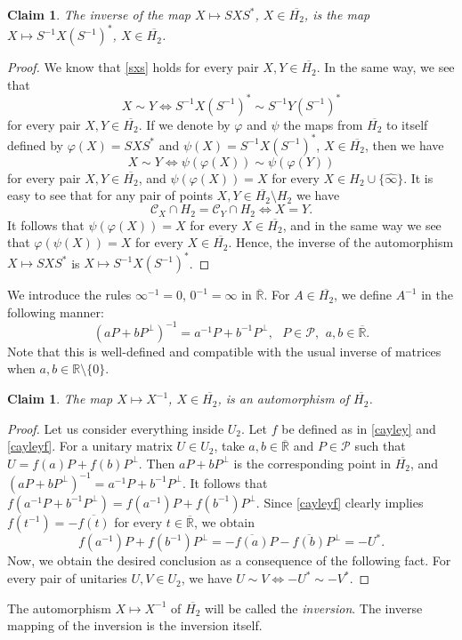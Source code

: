 \documentclass[10pt,a4paper]{amsart}
\providecommand{\index}[1]{}
\newcommand\cP{{\mathcal{P}}}
\newcommand\bR{{\mathbb{R}}}
\newcommand\oH{{\overline{H_2}}}
\newcommand\oi{{\widehat{\infty}}}
\newcommand\oR{{\overline{\mathbb{R}}}}
\newtheorem{claim}[theorem]{Claim}
\theoremstyle{definition}
\theoremstyle{remark}
\numberwithin{subsection}{section}
\numberwithin{equation}{section}
\begin{document}
\begin{claim}\label{SS-1}
The inverse of the map $X \mapsto SXS^\ast $, $X \in \oH$,  is the map $X \mapsto S^{-1}X(S^{-1})^\ast$, $X \in \oH$. 
\end{claim}
\begin{proof}
We know that \eqref{sxs} holds for every pair $X,Y \in \oH$. 
In the same way, we see that 
\[
X \sim Y \iff S^{-1}X(S^{-1})^\ast \sim  S^{-1}Y(S^{-1})^\ast
\]
for every pair $X,Y \in \oH$.
If we denote by $\varphi$ and $\psi$ the maps from $\oH$ to itself defined by $\varphi (X) = SXS^\ast$ and $\psi (X) =  S^{-1}X(S^{-1})^\ast$, $X \in \oH$, then 
we have 
\[
X \sim Y \iff \psi ( \varphi (X)) \sim \psi (\varphi (Y))
\]
for every pair $X,Y \in \oH$, and $\psi (\varphi  (X)) = X$ for every $X \in H_2 \cup \{ {\oi} \}$.
It is easy to see that for any pair of points $X,Y \in \oH\setminus H_2$ we have 
\begin{equation}\label{mrda}
\mathcal{C}_X \cap H_2 = \mathcal{C}_Y \cap H_2 \iff X=Y.
\end{equation}
It follows that  $\psi (\varphi  (X)) = X$ for every $X \in \oH$, and in the same way we see that $\varphi (\psi  (X)) = X$ for every $X \in \oH$.
Hence, the inverse of the automorphism $X \mapsto SXS^\ast$ is $X \mapsto S^{-1} X (S^{-1})^\ast$.
\end{proof}

We introduce the rules $\infty^{-1}= 0$, $0^{-1}=\infty$ in ${\oR}$.
For $A\in \oH$, we define $A^{-1}$ \index{$A^{-1}$} in the following manner:
\[
(aP +bP^{\perp})^{-1} = a^{-1} P+ b^{-1} P^{\perp}, \ \ \ P\in \mathcal{P}, \ \, a, b \in  {\oR}.
\]
Note that this is well-defined and compatible with the usual inverse of matrices when $a, b\in \bR\setminus \{0\}$.
\begin{claim}\label{cl}
The map $X \mapsto X^{-1}$, $X \in \oH$, is an automorphism of $\oH$. 
\end{claim}
\begin{proof}
Let us consider everything inside $U_2$. 
Let $f$ be defined as in \eqref{cayley} and \eqref{cayleyf}.
For a unitary matrix $U\in U_2$, take $a,b\in {\oR}$ and $P\in \cP$ such that $U=f(a) P + f(b) P^\perp$.
Then $aP+bP^\perp$ is the corresponding point in $\oH$, and $(aP+bP^\perp)^{-1}=a^{-1}P+b^{-1}P^\perp$. 
It follows that $f(a^{-1}P+b^{-1}P^\perp)=f(a^{-1})P+f(b^{-1})P^\perp$. 
Since \eqref{cayleyf} clearly implies $f(t^{-1})=-\overline{f(t)}$ for every $t\in {\oR}$, we obtain 
\[
f(a^{-1})P+f(b^{-1})P^\perp = -\overline{f(a)}P - \overline{f(b)}P^\perp = -U^*. 
\]
Now, we obtain the desired conclusion as a consequence of the following fact.  
For every pair of unitaries $U, V\in U_2$, we have $U \sim V \iff -U^* \sim -V^*$.
\end{proof}
The automorphism $X\mapsto X^{-1}$ of $\oH$ will be called the \emph{inversion}\index{inversion}.
The inverse mapping of the inversion is the inversion itself.
\end{document}
